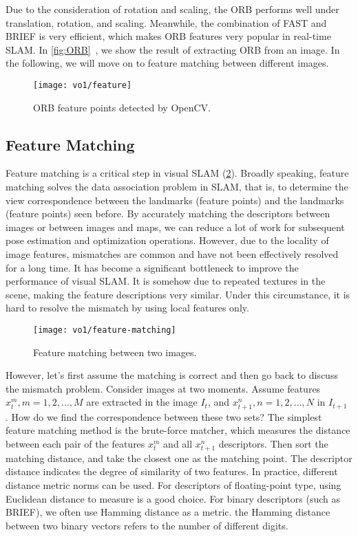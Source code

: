 Due to the consideration of rotation and scaling, the ORB performs well under translation, rotation, and scaling. Meanwhile, the combination of FAST and BRIEF is very efficient, which makes ORB features very popular in real-time SLAM. In \autoref{fig:ORB}~, we show the result of extracting ORB from an image. In the following, we will move on to feature matching between different images.

\begin{figure}[!htp]
    \centering
    \texttt{[image: vo1/feature]}\\
    \caption{ORB feature points detected by OpenCV.}
    \label{fig:ORB}
\end{figure}

\subsection{Feature Matching}

Feature matching is a critical step in visual SLAM (\ref{fig:feature-matching}). Broadly speaking, feature matching solves the data association problem in SLAM, that is, to determine the view correspondence between the landmarks (feature points) and the landmarks (feature points) seen before. By accurately matching the descriptors between images or between images and maps, we can reduce a lot of work for subsequent pose estimation and optimization operations. However, due to the locality of image features, mismatches are common and have not been effectively resolved for a long time. It has become a significant bottleneck to improve the performance of visual SLAM. It is somehow due to repeated textures in the scene, making the feature descriptions very similar. Under this circumstance, it is hard to resolve the mismatch by using local features only.

\begin{figure}[!htp]
    \centering
    \texttt{[image: vo1/feature-matching]}
    \caption{Feature matching between two images.}
    \label{fig:feature-matching}
\end{figure}

However, let's first assume the matching is correct and then go back to discuss the mismatch problem. Consider images at two moments. Assume features $x_{t}^{m}, m=1,2,...,M$ are extracted in the image $I_{t}$, and $x_{t+1}^{n}, n=1,2,...,N$ in $I_{t+1}$ . How do we find the correspondence between these two sets? The simplest feature matching method is the brute-force matcher, which measures the distance between each pair of the features $x_{t}^{m}$ and all $x_{t+1}^{n}$ descriptors. Then sort the matching distance, and take the closest one as the matching point. The descriptor distance indicates the degree of similarity of two features. In practice, different distance metric norms can be used. For descriptors of floating-point type, using Euclidean distance to measure is a good choice. For binary descriptors (such as BRIEF), we often use Hamming distance as a metric. the Hamming distance between two binary vectors refers to the number of different digits.

